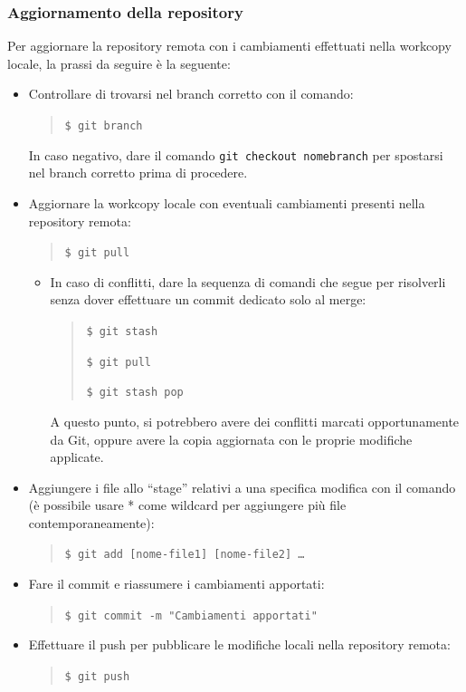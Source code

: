 		\subsubsection{Aggiornamento della repository}
		Per aggiornare la repository remota con i cambiamenti effettuati nella workcopy locale, la prassi da seguire è la seguente:
		\begin{itemize}
			\item Controllare di trovarsi nel branch corretto con il comando:
				\begin{quote}
					\texttt{\$\ git branch}
				\end{quote}
				In caso negativo, dare il comando \texttt{git checkout nomebranch} per spostarsi nel branch corretto prima di procedere.
			\item Aggiornare la workcopy locale con eventuali cambiamenti presenti nella repository remota:
				\begin{quote}
					\texttt{\$\ git pull}
				\end{quote}
			\begin{itemize}
				\item In caso di conflitti, dare la sequenza di comandi che segue per risolverli senza dover effettuare un commit
					dedicato solo al merge:
					\begin{quote}
						\texttt{\$\ git stash}\par
						\texttt{\$\ git pull}\par
						\texttt{\$\ git stash pop}\par
					\end{quote}
					A questo punto, si potrebbero avere dei conflitti marcati opportunamente da Git, oppure avere la copia aggiornata
					con le proprie modifiche applicate.
			\end{itemize}
			\item Aggiungere i file allo ``stage'' relativi a una specifica modifica con il comando (è possibile usare * come wildcard
				per aggiungere più file contemporaneamente):
				\begin{quote}
					\texttt{\$\ git add [nome-file1] [nome-file2] \dots}
				\end{quote}
			\item Fare il commit e riassumere i cambiamenti apportati:
			\begin{quote}
				\texttt{\$\ git commit -m "Cambiamenti apportati"}
			\end{quote}
			\item Effettuare il push per pubblicare le modifiche locali nella repository remota:
			\begin{quote}
				\texttt{\$\ git push}
			\end{quote}
		\end{itemize}


